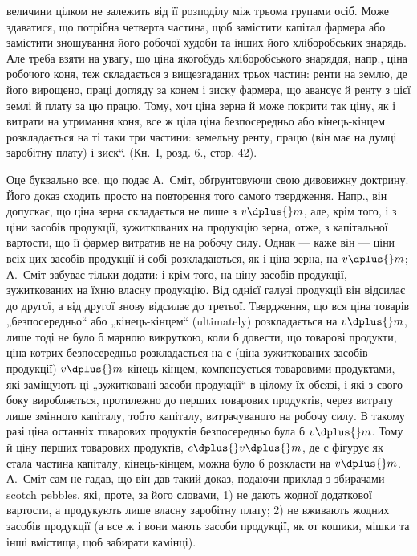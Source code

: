 \parcont{}  %
величини цілком не залежить від її розподілу між трьома групами осіб.
Може здаватися, що потрібна четверта частина, щоб замістити капітал
фармера або замістити зношування його робочої худоби та інших
його хліборобських знарядь. Але треба взяти на увагу, що ціна якогобудь
хліборобського знаряддя, напр., ціна робочого коня, теж складається
з вищезгаданих трьох частин: ренти на землю, де його вирощено,
праці догляду за конем і зиску фармера, що авансує й ренту з цієї
землі й плату за цю працю. Тому, хоч ціна зерна й може покрити так
ціну, як і витрати на утримання коня, все ж ціла ціна безпосередньо
або кінець-кінцем розкладається на ті таки три частини: земельну ренту,
працю (він має на думці заробітну плату) і зиск“. (Кн.~І, розд. 6.,
стор. 42).

Оце буквально все, що подає А.~Сміт, обґрунтовуючи свою дивовижну
доктрину. Його доказ сходить просто на повторення того самого
твердження. Напр., він допускає, що ціна зерна складається не лише з
$v \dplus{} m$, але, крім того, і з ціни засобів продукції, зужиткованих на продукцію
зерна, отже, з капітальної вартости, що її фармер витратив не
на робочу силу. Однак — каже він — ціни всіх цих засобів продукції й
собі розкладаються, як і ціна зерна, на $v \dplus{} m$; А.~Сміт забуває тільки
додати: і крім того, на ціну засобів продукції, зужиткованих на їхню
власну продукцію. Від однієї галузі продукції він відсилає до другої, а
від другої знову відсилає до третьої. Твердження, що вся ціна товарів
„безпосередньо“ або „кінець-кінцем“ (ultimately) розкладається на $v \dplus{} m$,
лише тоді не було б марною викруткою, коли б довести, що товарові
продукти, ціна котрих безпосередньо розкладається на $с$ (ціна зужиткованих
засобів продукції) \dplus{} $v \dplus{} m$ кінець-кінцем, компенсується товаровими
продуктами, які заміщують ці „зужитковані засоби продукції“ в
цілому їх обсязі, і які з свого боку виробляється, протилежно до перших
товарових продуктів, через витрату лише змінного капіталу, тобто
капіталу, витрачуваного на робочу силу. В такому разі ціна останніх
товарових продуктів безпосередньо була б \deq{} $v \dplus{} m$. Тому й ціну перших
товарових продуктів, $c \dplus{} v \dplus{} m$, де $с$ фігурує як стала частина
капіталу, кінець-кінцем, можна було б розкласти на $v \dplus{} m$. А.~Сміт сам
не гадав, що він дав такий доказ, подаючи приклад з збирачами scotch
pebbles, які, проте, за його словами, 1) не дають жодної додаткової вартости,
а продукують лише власну заробітну плату; 2) не вживають жодних
засобів продукції (а все ж і вони мають засоби продукції, як от
кошики, мішки та інші вмістища, щоб забирати камінці).

